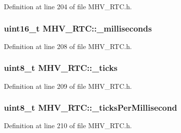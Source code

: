 \-Definition at line 204 of file \-M\-H\-V\-\_\-\-R\-T\-C.\-h.

\hypertarget{class_m_h_v___r_t_c_acd3e486b5e5ee1d8cf9d961c0fdbde57}{
\subsubsection[{\-\_\-milliseconds}]{\setlength{\rightskip}{0pt plus 5cm}uint16\-\_\-t {\bf \-M\-H\-V\-\_\-\-R\-T\-C\-::\-\_\-milliseconds}}}
\label{class_m_h_v___r_t_c_acd3e486b5e5ee1d8cf9d961c0fdbde57}


\-Definition at line 208 of file \-M\-H\-V\-\_\-\-R\-T\-C.\-h.

\hypertarget{class_m_h_v___r_t_c_ab29c30f80f7234394299476c73f36baf}{
\subsubsection[{\-\_\-ticks}]{\setlength{\rightskip}{0pt plus 5cm}uint8\-\_\-t {\bf \-M\-H\-V\-\_\-\-R\-T\-C\-::\-\_\-ticks}}}
\label{class_m_h_v___r_t_c_ab29c30f80f7234394299476c73f36baf}


\-Definition at line 209 of file \-M\-H\-V\-\_\-\-R\-T\-C.\-h.

\hypertarget{class_m_h_v___r_t_c_a48e7d03e90e78881ed8833d6e4f77b36}{
\subsubsection[{\-\_\-ticks\-Per\-Millisecond}]{\setlength{\rightskip}{0pt plus 5cm}uint8\-\_\-t {\bf \-M\-H\-V\-\_\-\-R\-T\-C\-::\-\_\-ticks\-Per\-Millisecond}}}
\label{class_m_h_v___r_t_c_a48e7d03e90e78881ed8833d6e4f77b36}


\-Definition at line 210 of file \-M\-H\-V\-\_\-\-R\-T\-C.\-h.

